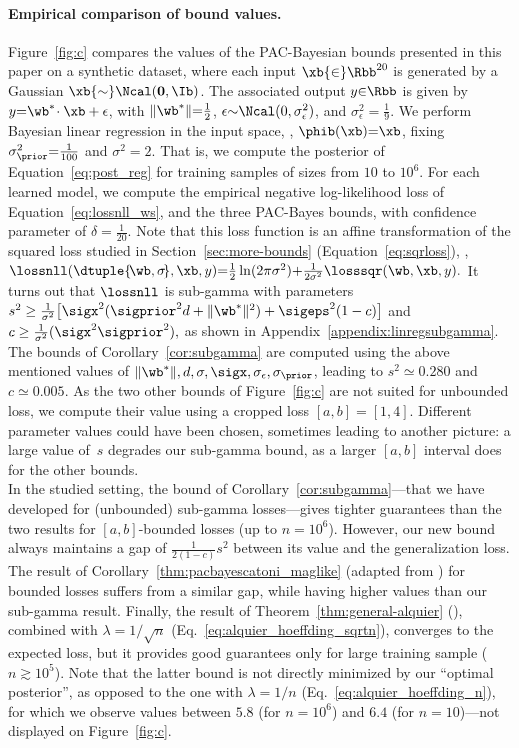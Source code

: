 \documentclass{article}
\theoremstyle{definition}
\theoremstyle{plain}
\begin{document}
\paragraph{Empirical comparison of bound values.} Figure~\ref{fig:c} compares the values of the PAC-Bayesian bounds presented in this paper on a synthetic dataset, where each input $\xb{\in}\Rbb^{20}$ is generated by a Gaussian $\xb{\sim} \Ncal(\mathbf0,\Ib)$.
%
The associated output $y{\in}\Rbb$ is given by $y{=}\wb^*\!\cdot\xb+\epsilon$, with $\|\wb^*\|{=}\frac1{2}$,  $\epsilon{\sim}\Ncal(0,\sigma_\epsilon^2)$, and $\sigma_\epsilon^2 {=} \frac19$. We perform Bayesian linear regression in the input space, \ie, $\phib(\xb){=}\xb$, fixing $\sigma_\prior^2{=}\frac{1}{100}$ and $\sigma^2{=}2$.
That is, we compute the posterior of Equation~\eqref{eq:post_reg} for training samples of sizes from $10$ to $10^6$.
 For each learned model, we compute the empirical negative log-likelihood loss of Equation~\eqref{eq:lossnll_ws}, and the three PAC-Bayes bounds, with confidence parameter of $\delta{=}\frac1{20}$.
Note that this loss function 
%
is an affine transformation of the squared loss studied in Section~\ref{sec:more-bounds} (Equation~\ref{eq:sqrloss}), \ie,
%
%
%
%
%
%
$\lossnll(\dtuple{\!\wb, \sigma\!},\xb,y) {=} \tfrac12 \ln(2\pi\sigma^2) {+} \tfrac1{2\sigma^2} \losssqr(\wb,\xb,y).$ It turns out that $\lossnll$ is sub-gamma with parameters
$s^2\geq  \frac1{\sigma^2} \big[\sigx^2(\sigprior^2d+ \|\wb^*\|^2)+ \sigeps^2(1- c) \big] $ and 
$c \geq  \tfrac{1}{\sigma^2} (\sigx^2\sigprior^2),$ as shown in Appendix~\ref{appendix:linregsubgamma}. The bounds of 
Corollary~\ref{cor:subgamma} are computed using the above mentioned values of 
$\|\wb^*\|, d,\sigma, \sigx,\sigma_\epsilon, \sigma_\prior$,
leading to $s^2\simeq 0.280$ and $c \simeq 0.005$. As the two other bounds of Figure~\ref{fig:c} are not suited for unbounded loss, we compute their value using a cropped loss $[a,b]=[1,4]$. 
Different parameter values could have been chosen, sometimes leading to another picture: a large value of~$s$ degrades our sub-gamma bound, as a larger $[a,b]$ interval does for the other bounds.\\[1mm]
%
%
In the studied setting, 
%
the bound of Corollary~\ref{cor:subgamma}---that we have developed for (unbounded) sub-gamma losses---gives  tighter guarantees than the two results for $[a,b]$-bounded losses (up to $n{=}10^6$). However, our new bound always maintains a gap of 
%
$\frac1{2(1{-}c)} s^2$ 
between its value and the generalization loss.
The result of Corollary~\ref{thm:pacbayescatoni_maglike} (adapted from \citet{catoni-07}) for bounded losses suffers from a similar gap, while having higher values than our sub-gamma result. Finally, the result of Theorem~\ref{thm:general-alquier} (\citet{alquier-15}), combined with $\lambda=1/\sqrt{n}$ (Eq.~\ref{eq:alquier_hoeffding_sqrtn}), converges to the expected loss, but it provides good guarantees only for large training sample ($n\gtrsim 10^5$). Note that the latter bound is not directly minimized by our ``optimal posterior'', as opposed to the one with $\lambda=1/{n}$ (Eq.~\ref{eq:alquier_hoeffding_n}), for which we observe values 
between $5.8$ (for $n{=}10^6$)  and $6.4$ (for $n{=}10$)---not displayed on Figure~\ref{fig:c}.
\end{document}
